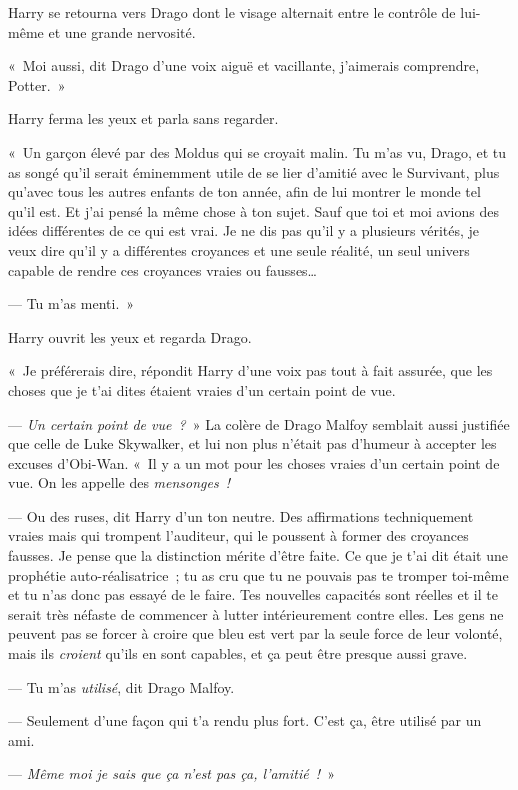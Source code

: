 Harry se retourna vers Drago dont le visage alternait entre le contrôle de lui-même et une grande nervosité.

«~Moi aussi, dit Drago d'une voix aiguë et vacillante, j'aimerais comprendre, Potter.~»

Harry ferma les yeux et parla sans regarder.

«~Un garçon élevé par des Moldus qui se croyait malin. Tu m'as vu, Drago, et tu as songé qu'il serait éminemment utile de se lier d'amitié avec le Survivant, plus qu'avec tous les autres enfants de ton année, afin de lui montrer le monde tel qu'il est. Et j'ai pensé la même chose à ton sujet. Sauf que toi et moi avions des idées différentes de ce qui est vrai. Je ne dis pas qu'il y a plusieurs vérités, je veux dire qu'il y a différentes croyances et une seule réalité, un seul univers capable de rendre ces croyances vraies ou fausses…

--- Tu m'as menti.~»

Harry ouvrit les yeux et regarda Drago.

«~Je préférerais dire, répondit Harry d'une voix pas tout à fait assurée, que les choses que je t'ai dites étaient vraies d'un certain point de vue.

--- \emph{Un certain point de vue~?}~» La colère de Drago Malfoy semblait aussi justifiée que celle de Luke Skywalker, et lui non plus n'était pas d'humeur à accepter les excuses d'Obi-Wan. «~Il y a un mot pour les choses vraies d'un certain point de vue. On les appelle des \emph{mensonges~!}

--- Ou des ruses, dit Harry d'un ton neutre. Des affirmations techniquement vraies mais qui trompent l'auditeur, qui le poussent à former des croyances fausses. Je pense que la distinction mérite d'être faite. Ce que je t'ai dit était une prophétie auto-réalisatrice~; tu as cru que tu ne pouvais pas te tromper toi-même et tu n'as donc pas essayé de le faire. Tes nouvelles capacités sont réelles et il te serait très néfaste de commencer à lutter intérieurement contre elles. Les gens ne peuvent pas se forcer à croire que bleu est vert par la seule force de leur volonté, mais ils \emph{croient} qu'ils en sont capables, et ça peut être presque aussi grave.

--- Tu m'as \emph{utilisé}, dit Drago Malfoy.

--- Seulement d'une façon qui t'a rendu plus fort. C'est ça, être utilisé par un ami.

--- \emph{Même moi je sais que ça n'est pas ça, l'amitié~!}~»

